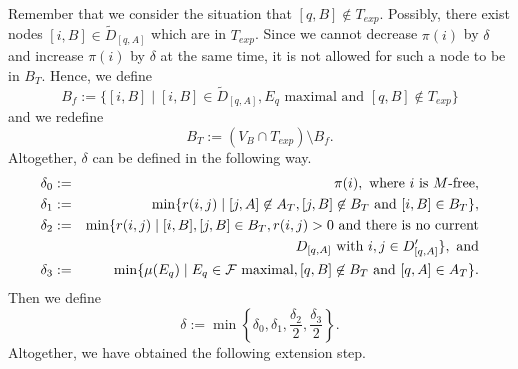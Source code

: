 \documentclass[12pt,twoside,a4paper]{article}
\begin{document}
Remember that we consider the situation that $[q,B] \not\in T_{exp}$.
Possibly, there exist nodes $[i,B] \in \tilde D_{[q,A]}$ which are
in $T_{exp}$. Since we cannot decrease $\pi(i)$ by $\delta$ and increase $\pi(i)$ by
$\delta$ at the same time, it is not allowed for such a node to be in $B_T$. 
Hence, we define 
$$
B_f := \{[i,B] \mid [i,B] \in \tilde D_{[q,A]}, E_q \mbox{ maximal and }
[q,B] \not\in T_{exp}\}
$$
and we redefine
$$B_T := (V_B \cap T_{exp}) \setminus B_f.$$
Altogether, $\delta$ can be defined in the following way.
\begin{eqnarray*}
\delta_0 & := & \pi(i), \mbox{ where $i$ is $M$-free}, \\
\delta_1 & := & \min\{r(i,j) \mid  [j,A] \not\in A_T, [j,B] \not\in B_T \mbox{ and } 
[i,B] \in B_T \}, \\
\delta_2 & := & \min\{r(i,j)  \mid [i,B],[j,B] \in B_T, r(i,j) > 0 \mbox{ and there is 
no current} \\ 
& & \qquad \qquad \qquad D_{[q,A]} \mbox{ with } i,j \in D'_{[q,A]}\}, \mbox{ and} \\
\delta_3 & := & \min\{\mu(E_q) \mid E_q \in {\cal F} \mbox{ maximal}, [q,B] \not\in B_T 
\mbox{ and } [q,A] \in A_T\}.
\end{eqnarray*}
Then we define
$$\delta := \min \left\{\delta_0, \delta_1, \frac{\delta_2}{2}, \frac{\delta_3}{2}\right\}.$$
Altogether, we have obtained the following extension step.
\end{document}
